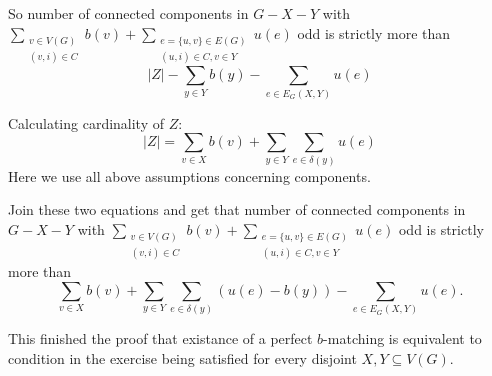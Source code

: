 \begin{exercise}{3}
    So number of connected components in $G - X - Y$ with $\sum_{\substack{v \in V(G)\\
    (v, i) \in C}} b(v) + \sum_{\substack{e = \{u, v\} \in E(G)\\ (u, i) \in C,
    v \in Y}} u(e)$ odd is strictly more than
    \begin{equation*}
        |Z| - \sum_{y \in Y} b(y) - \sum_{e \in E_G(X, Y)} u(e)
    \end{equation*}

    Calculating cardinality of $Z$:
    \begin{equation*}
        |Z| = \sum_{v \in X} b(v) + \sum_{y \in Y} \sum_{e \in \delta(y)} u(e)
    \end{equation*}
    Here we use all above assumptions concerning components.

    Join these two equations and get that number of connected components in $G -
    X - Y$ with $\sum_{\substack{v \in V(G)\\ (v, i) \in C}} b(v) +
    \sum_{\substack{e = \{u, v\} \in E(G)\\ (u, i) \in C, v \in Y}} u(e)$ odd is
    strictly more than
    \begin{equation*}
        \sum_{v \in X} b(v) + \sum_{y \in Y} \sum_{e \in \delta(y)} (u(e) -
        b(y)) - \sum_{e \in E_G(X, Y)} u(e).
    \end{equation*}

    This finished the proof that existance of a perfect $b$-matching is
    equivalent to condition in the exercise being satisfied for every disjoint
    $X, Y \subseteq V(G)$.
    


\end{exercise}


